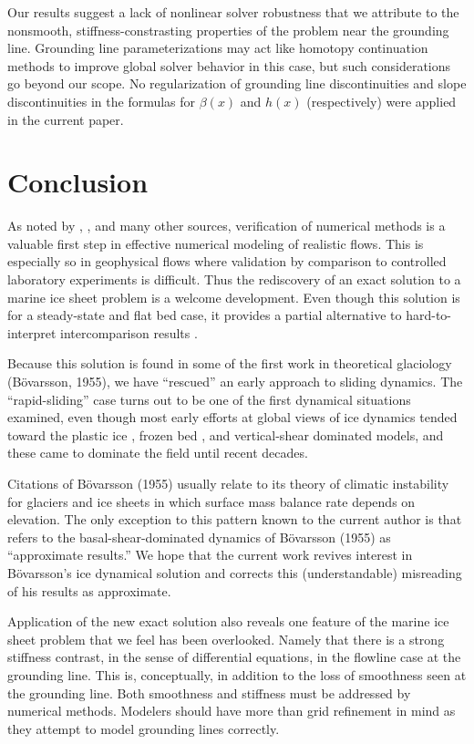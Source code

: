 \documentclass[twocolumn,letterpaper]{igs}
\renewcommand{\dh}{\fontencoding{T1}\selectfont{\symbol{240}}}
\newcommand{\bod}{B\"o\dh varsson\xspace}
\newcommand{\citebod}{B\"o\dh varsson (1955)\nocite{Bodvardsson}\xspace}
\newcommand{\citepbod}{(B\"o\dh varsson, 1955)\nocite{Bodvardsson}\xspace}
\begin{document}
Our results suggest a lack of nonlinear solver robustness that we attribute to the nonsmooth, stiffness-constrasting properties of the problem near the grounding line.  Grounding line parameterizations \citep[e.g.][]{Gladstoneetal2010,Feldmannetal2014} may act like homotopy continuation methods \citep{Kelley} to improve global solver behavior in this case, but such considerations go beyond our scope.  No regularization of grounding line discontinuities and slope discontinuities in the formulas for $\beta(x)$ and $h(x)$ (respectively) were applied in the current paper.


\section{Conclusion}  As noted by \cite{BLKCB}, \cite{Wesseling}, and many other sources, verification of numerical methods is a valuable first step in effective numerical modeling of realistic flows.  This is especially so in geophysical flows where validation by comparison to controlled laboratory experiments is difficult.  Thus the rediscovery of an exact solution to a marine ice sheet problem is a welcome development.  Even though this solution is for a steady-state and flat bed case, it provides a partial alternative to hard-to-interpret intercomparison results \citep{MISMIP2012}.

Because this solution is found in some of the first work in theoretical glaciology \citepbod, we have ``rescued'' an early approach to sliding dynamics.  The ``rapid-sliding'' case turns out to be one of the first dynamical situations examined, even though most early efforts at global views of ice dynamics tended toward the plastic ice \citep{Orowan,Nye52plastic}, frozen bed \citep{Vialov}, and vertical-shear dominated \citep{Weertman61stability} models, and these came to dominate the field until recent decades.

Citations of \citebod usually relate to its theory of climatic instability for glaciers and ice sheets in which surface mass balance rate depends on elevation.  The only exception to this pattern known to the current author is that \cite{Fowler1992} refers to the basal-shear-dominated dynamics of \citebod as ``approximate results.''  We hope that the current work revives interest in \bod's ice dynamical solution and corrects this (understandable) misreading of his results as approximate.

Application of the new exact solution also reveals one feature of the marine ice sheet problem that we feel has been overlooked.  Namely that there is a strong stiffness contrast, in the sense of differential equations, in the flowline case at the grounding line.  This is, conceptually, in addition to the loss of smoothness seen at the grounding line.  Both smoothness and stiffness must be addressed by numerical methods.  Modelers should have more than grid refinement in mind as they attempt to model grounding lines correctly.
\end{document}
